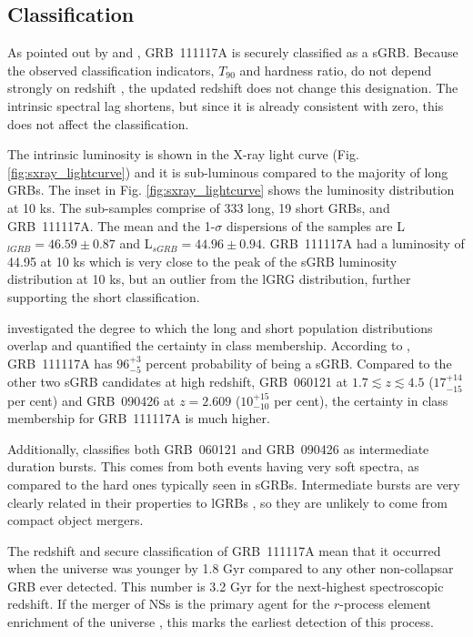 \documentclass{aa}    %
\begin{document}
\subsection{Classification} \label{classification}

As pointed out by \citet{Margutti2012} and \citet{Sakamoto2013}, GRB~111117A is
securely classified as a sGRB. Because the observed classification indicators,
$T_{90}$ and hardness ratio, do not depend strongly on redshift
\citep{Littlejohns2013a}, the updated redshift does not change this designation.
The intrinsic spectral lag shortens, but since it is already consistent with
zero, this does not affect the classification.

The intrinsic luminosity is shown in the X-ray light curve (Fig.
\ref{fig:sxray_lightcurve}) and it is sub-luminous compared to the majority of
long GRBs. The inset in Fig. \ref{fig:sxray_lightcurve} shows the luminosity
distribution at 10 ks. The sub-samples comprise of 333 long, 19 short GRBs, and
GRB~111117A. The mean and the 1-$\sigma$ dispersions of the samples are
L$_{lGRB} = 46.59 \pm 0.87$ and L$_{sGRB} = 44.96 \pm 0.94$. GRB~111117A had a
luminosity of 44.95 at 10 ks which is very close to the peak of the sGRB
luminosity distribution at 10 ks, but an outlier from the lGRG distribution,
further supporting the short classification.

\citet{Bromberg2013} investigated the degree to which the long and short
population distributions overlap and quantified the certainty in class
membership. According to \citet{Bromberg2013}, GRB~111117A has $96_{-5}^{+3}$
percent probability of being a sGRB. Compared to the other two sGRB candidates
at high redshift, GRB~060121 \citep{DeUgartePostigo2006, Levan2006} at $1.7
\lesssim z \lesssim 4.5$ ($17_{-15}^{+14}$ per cent) and GRB~090426
\citep{Antonelli2009, Levesque2010, Thone2011} at $z = 2.609$ ($10_{-10}^{+15}$
per cent), the certainty in class membership for GRB~111117A is much higher.

Additionally, \citet{Horvath2010} classifies both GRB~060121 and GRB~090426 as
intermediate duration bursts. This comes from both events having very soft
spectra, as compared to the hard ones typically seen in sGRBs. Intermediate
bursts are very clearly related in their properties to lGRBs
\citep{DeUgartePostigo2011}, so they are unlikely to come from compact object
mergers.

The redshift and secure classification of GRB~111117A mean that it occurred
when the universe was younger by 1.8 Gyr compared to any other non-collapsar GRB
ever detected. This number is 3.2 Gyr for the next-highest spectroscopic
redshift. If the merger of NSs is the primary agent for the $r$-process element
enrichment of the universe \citep{Goriely2011, Ji2016, Komiya2016}, this
marks the earliest detection of this process.
\end{document}

